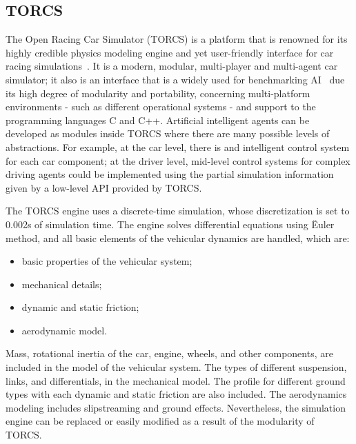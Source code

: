 \subsection{TORCS} \label{subsec:TORCS}

	The Open Racing Car Simulator (TORCS) is a platform that is renowned for its highly credible physics modeling engine and yet user-friendly interface for car racing simulations~\cite{TORCS}. It is a modern, modular, multi-player and multi-agent car simulator; it also is an interface that is a widely used for benchmarking AI~\cite{2009} due its high degree of modularity and portability, concerning multi-platform environments - such as different operational systems - and support to the programming languages C and C++. Artificial intelligent agents can be developed as modules inside TORCS where there are many possible levels of abstractions. For example, at the car level, there is and intelligent control system for each car component; at the driver level, mid-level control systems for complex driving agents could be implemented using the partial simulation information given by a low-level API provided by TORCS.

	The TORCS engine uses a discrete-time simulation, whose discretization is set to 0.002s of simulation time. The engine solves differential equations using \"{E}uler method, and all basic elements of the vehicular dynamics are handled, which are:

	\begin{itemize}
		
		\item basic properties of the vehicular system;
		
		\item mechanical details;
		
		\item dynamic and static friction;
		
		\item aerodynamic model.
		
	\end{itemize}

	Mass, rotational inertia of the car, engine, wheels, and other components, are included in the model of the vehicular system. The types of different suspension, links, and differentials, in the mechanical model. The profile for different ground types with each dynamic and static friction are also included. The aerodynamics modeling includes slipstreaming and ground effects. Nevertheless, the simulation engine can be replaced or easily modified as a result of the modularity of TORCS.
	
